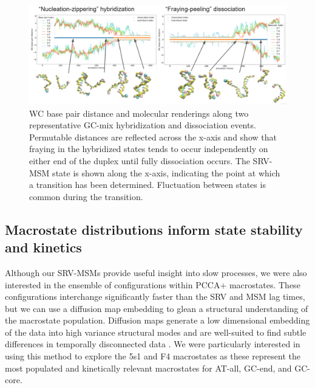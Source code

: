 \documentclass[journal=jpcbfk,manuscript=article]{achemso}
\begin{document}
\begin{figure} %
	\begin{center}
        \includegraphics[width=450, scale=1]{Fig6.pdf}
        \caption{WC base pair distance and molecular renderings along two representative GC-mix hybridization and dissociation events. Permutable distances are reflected across the x-axis and show that fraying in the hybridized states tends to occur independently on either end of the duplex until fully dissociation occurs. The SRV-MSM state is shown along the x-axis, indicating the point at which a transition has been determined. Fluctuation between states is common during the transition.}
        \label{fig:GC-mix_transitions}
	\end{center}
\end{figure}


\subsection{Macrostate distributions inform state stability and kinetics}

Although our SRV-MSMs provide useful insight into slow processes, we were also interested in the ensemble of configurations within PCCA+ macrostates. These configurations interchange significantly faster than the SRV and MSM lag times, but we can use a diffusion map embedding to glean a structural understanding of the macrostate population. Diffusion maps generate a low dimensional embedding of the data into high variance structural modes and are well-suited to find subtle differences in temporally disconnected data \citep{Coifman2006DiffusionMaps, Ferguson2010SystematicMaps}. We were particularly interested in using this method to explore the 5s1 and F4 macrostates as these represent the most populated and kinetically relevant macrostates for AT-all, GC-end, and GC-core.
\end{document}
